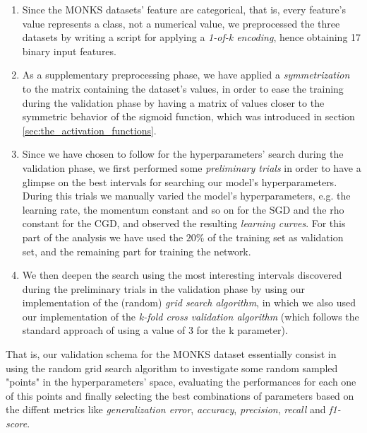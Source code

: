         \begin{enumerate}
            \item Since the MONKS datasets’ feature are categorical, that is, every feature’s value represents a
            class, not a numerical value, we preprocessed the three datasets by writing a script
            for applying a \textit{1-of-k encoding}, hence obtaining 17 binary input features.
            \item As a supplementary preprocessing phase, we have applied a \textit{symmetrization} to the matrix
            containing the dataset’s values, in order to ease the training during the validation phase by having a
            matrix of values closer to the symmetric behavior of the sigmoid function, which was introduced in
            section \ref{sec:the_activation_functions}.
            \item Since we have chosen to follow \cite{Bergstra:2012:RSH:2188385.2188395} for the hyperparameters'
            search during the validation phase, we first performed some \textit{preliminary trials} in order to
            have a glimpse on the best intervals for searching our model's hyperparameters. During this trials we
            manually varied the model's hyperparameters, e.g. the learning rate, the momentum constant and so on
            for the SGD and the rho constant for the CGD, and observed the resulting \textit{learning curves}. For
            this part of the analysis we have used the $20\%$ of the training set as validation set, and the
            remaining part for training the network.
            \item We then deepen the search using the most interesting intervals discovered during the preliminary
            trials in the validation phase by using our implementation of the (random)
            \textit{grid search algorithm}, in which we also used our implementation of the
            \textit{k-fold cross validation algorithm} (which follows the standard approach of using a value of 3
            for the k parameter).
        \end{enumerate}

        That is, our validation schema for the MONKS dataset essentially consist in using the random grid search
        algorithm to investigate some random sampled "points" in the hyperparameters' space, evaluating the
        performances for each one of this points and finally selecting the best combinations of parameters based
        on the diffent metrics like \textit{generalization error}, \textit{accuracy}, \textit{precision},
        \textit{recall} and \textit{f1-score}.

